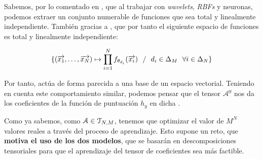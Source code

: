 \begin{observacion}
    Sabemos, por lo comentado en , que al trabajar con \textit{wavelets}, \textit{RBFs} y neuronas, podemos extraer un conjunto numerable de funciones que sea total y linealmente independiente. También gracias a , que por tanto el siguiente espacio de funciones es total y linealmente independiente:

    $$\{(\overrightarrow{x_1}, \ldots, \overrightarrow{x_N}) \mapsto \prod_{i = 1}^{N} f_{\theta_{d_i}} (\overrightarrow{x_i}) \ \  / \ \  d_i \in \Delta_{M} \ \  \forall i \in \Delta_{N}\}$$

    Por tanto, actúa de forma parecida a una base de un espacio vectorial. Teniendo en cuenta este comportamiento similar, podemos pensar que el tensor $\mathcal{A}^y$ nos da los coeficientes de la función de puntuación $h_y$ en dicha .

\end{observacion}

\begin{observacion}
    Como ya sabemos, como $\mathcal{A} \in \mathcal{T}_{N, M}$, tenemos que optimizar el valor de $M^N$ valores reales a través del proceso de aprendizaje. Esto supone un reto, que \textbf{motiva el uso de los dos modelos}, que se basarán en descomposiciones tensoriales para que el aprendizaje del tensor de coeficientes sea más factible.
\end{observacion}

\endinput
